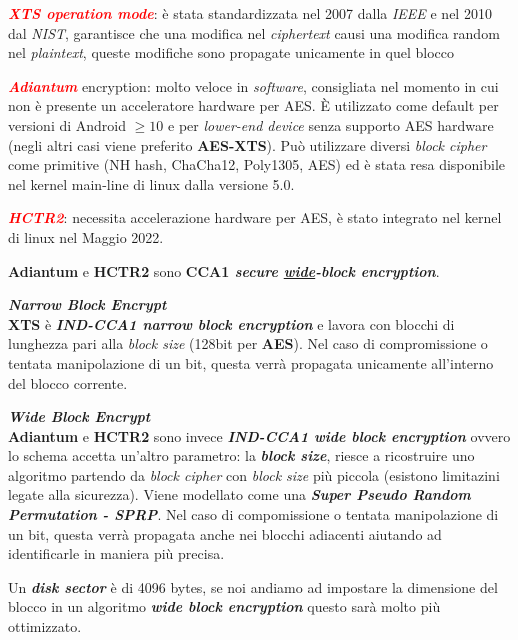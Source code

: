 \begin{flushleft}
    \textcolor{red}{\textbf{\textit{XTS operation mode}}}: è stata standardizzata nel 2007 dalla \textit{IEEE} e nel 2010 dal \textit{NIST}, garantisce che una modifica nel \textit{ciphertext} causi una modifica random nel \textit{plaintext}, queste modifiche sono propagate unicamente in quel blocco
    
    \smallskip

    \textcolor{red}{\textbf{\textit{Adiantum}}} encryption: molto veloce in \textit{software}, consigliata nel momento in cui non è presente un acceleratore hardware per AES. È utilizzato come default per versioni di Android $\geq 10$ e per \textit{lower-end device} senza supporto AES hardware (negli altri casi viene preferito \textbf{AES-XTS}). Può utilizzare diversi \textit{block cipher} come primitive (NH hash, ChaCha12, Poly1305, AES) ed è stata resa disponibile nel kernel main-line di linux dalla versione 5.0.

    \smallskip

    \textcolor{red}{\textbf{\textit{HCTR2}}}: necessita accelerazione hardware per AES, è stato integrato nel kernel di linux nel Maggio 2022.

    \textbf{Adiantum} e \textbf{HCTR2} sono \textbf{CCA1 \textit{secure \underline{wide}-block encryption}}.

    {\centering
        \begin{minipage}[t]{0.45\textwidth}
            \textbf{\textit{Narrow Block Encrypt}} \\
            \textbf{XTS} è \textbf{\textit{IND-CCA1 narrow block encryption}} e lavora con blocchi di lunghezza pari alla \textit{block size} (128bit per \textbf{AES}). Nel caso di compromissione o tentata manipolazione di un bit, questa verrà propagata unicamente all'interno del blocco corrente.
        \end{minipage}
        \hfill
        \begin{minipage}[t]{0.5\textwidth}
            \textbf{\textit{Wide Block Encrypt}} \\
            \textbf{Adiantum} e \textbf{HCTR2} sono invece \textbf{\textit{IND-CCA1 wide block encryption}} ovvero lo schema accetta un'altro parametro: la \textbf{\textit{block size}}, riesce a ricostruire uno algoritmo partendo da \textit{block cipher} con \textit{block size} più piccola (esistono limitazini legate alla sicurezza). Viene modellato come una \textbf{\textit{Super Pseudo Random Permutation - SPRP}}. Nel caso di compomissione o tentata manipolazione di un bit, questa verrà propagata anche nei blocchi adiacenti aiutando ad identificarle in maniera più precisa.
        \end{minipage}
    \par}
    Un \textbf{\textit{disk sector}} è di 4096 bytes, se noi andiamo ad impostare la dimensione del blocco in un algoritmo \textbf{\textit{wide block encryption}} questo sarà molto più ottimizzato.
\end{flushleft}

